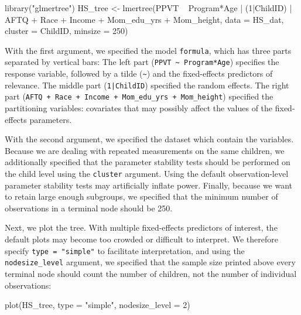 \documentclass[doc,floatsintext,natbib]{apa7}
\begin{document}
\begin{Schunk}
\begin{Sinput}
 library("glmertree")
 HS_tree <- lmertree(PPVT ~ Program*Age | (1|ChildID) | AFTQ + Race + 
                       Income + Mom_edu_yrs + Mom_height, 
                     data = HS_dat, cluster = ChildID, minsize = 250)
\end{Sinput}
\end{Schunk}

With the first argument, we specified the model \verb|formula|, which has three parts separated by vertical bars: The left part (\verb|PPVT ~ Program*Age|) specifies the response variable, followed by a tilde (\verb|~|) and the fixed-effects predictors of relevance. The middle part (\texttt{1|ChildID}) specified the random effects. The right part (\verb|AFTQ + Race + Income + Mom_edu_yrs + Mom_height|) specified the partitioning variables: covariates that may possibly affect the values of the fixed-effects parameters. 

With the second argument, we specified the dataset which contain the variables. Because we are dealing with repeated measurements on the same children, we additionally specified that the parameter stability tests should be performed on the child level using the \verb|cluster| argument. Using the default observation-level parameter stability tests may artificially inflate power. Finally, because we want to retain large enough subgroups, we specified that the minimum number of observations in a terminal node should be 250.

Next, we plot the tree. With multiple fixed-effects predictors of interest, the default plots may become too crowded or difficult to interpret. We therefore specify \verb|type = "simple"| to facilitate interpretation, and using the \verb|nodesize_level| argument, we specified that the sample size printed above every terminal node should count the number of children, not the number of individual observations:

\begin{Schunk}
\begin{Sinput}
 plot(HS_tree, type = "simple", nodesize_level = 2)
\end{Sinput}
\end{Schunk}
\end{document}
